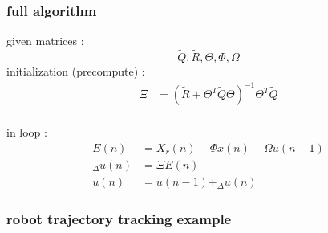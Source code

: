 \documentclass{beamer}
\begin{document}
\begin{frame}
  
  \frametitle{\bf full algorithm}
  given matrices : $$\tilde{Q}, \tilde{R}, \Theta, \Phi, \Omega$$
  initialization (precompute) :
  \begin{align*}
  \Xi &= (\tilde{R} + \Theta^T\tilde{Q}\Theta)^{-1} \Theta^T\tilde{Q} \\
  \end{align*}
  
  in loop :
  \begin{align*}
    E(n) &= X_r(n) - \Phi x(n) - \Omega u(n-1) \\
    _\Delta u(n) &= \Xi E(n) \\
    u(n) &= u(n-1) + _\Delta u(n)
  \end{align*}
\end{frame}









\begin{frame}
  
  \frametitle{\textbf { robot trajectory tracking example}}

\end{frame}
\end{document}
